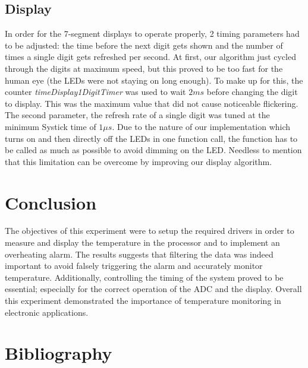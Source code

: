 \documentclass[12pt]{article}
\begin{document}
\subsection{Display}
In order for the 7-segment displays to operate properly, 2 timing parameters had to be adjusted: the time before the next digit gets shown and the number of times a single digit gets refreshed per second. At first, our algorithm just cycled through the digits at maximum speed, but this proved to be too fast for the human eye (the LEDs were not staying on long enough). To make up for this, the counter \textit{timeDisplay1DigitTimer} was used to wait $2ms$ before changing the digit to display. This was the maximum value that did not cause noticeable flickering. The second parameter, the refresh rate of a single digit was tuned at the minimum Systick time of $1\mu s$. Due to the nature of our implementation which turns on and then directly off the LEDs in one function call, the function has to be called as much as possible to avoid dimming on the LED. Needless to mention that this limitation can be overcome by improving our display algorithm.

\section{Conclusion}
The objectives of this experiment were to setup the required drivers in order to measure and display the temperature in the processor and to implement an overheating alarm. The results suggests that filtering the data was indeed important to avoid falsely triggering the alarm and accurately monitor temperature. Additionally, controlling the timing of the system proved to be essential; especially for the correct operation of the ADC and the display. Overall this experiment demonstrated the importance of temperature monitoring in electronic applications.

\newpage
\section{Bibliography}

 
\end{document}
